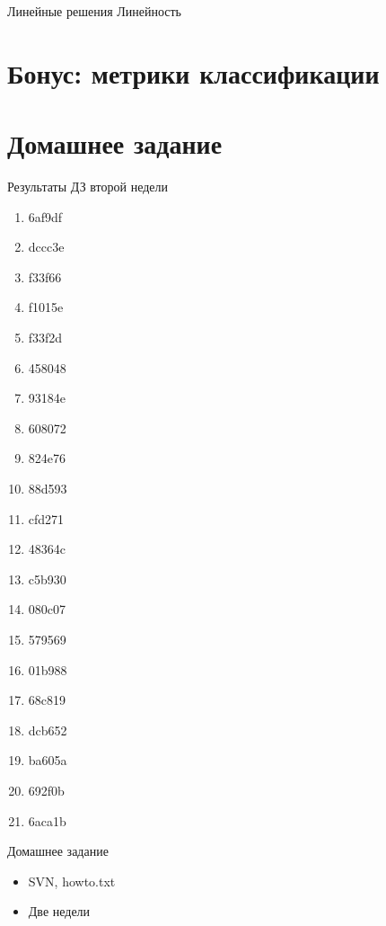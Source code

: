 \documentclass[14pt, fleqn, xcolor={dvipsnames, table}]{beamer}
\begin{document}
\begin{frame}{Линейные решения}
Линейность
\end{frame}

\section{Бонус: метрики классификации}

\section{Домашнее задание}
\begin{frame}{Результаты ДЗ второй недели}
\scriptsize
\begin{center}
\begin{enumerate}
\item 6af9df
\item dccc3e
\item f33f66
\item f1015e
\item f33f2d
\item 458048
\item 93184e
\item 608072
\item 824e76
\item 88d593
\item cfd271
\item 48364c
\item c5b930
\item 080c07
\item 579569
\item 01b988
\item 68c819
\item dcb652
\item ba605a
\item 692f0b
\item 6aca1b
\end{enumerate}
\end{center}
\end{frame}
\begin{frame}{Домашнее задание}
\begin{itemize}
\item SVN, howto.txt
\item Две недели
\end{itemize}
\end{frame}
\end{document}
